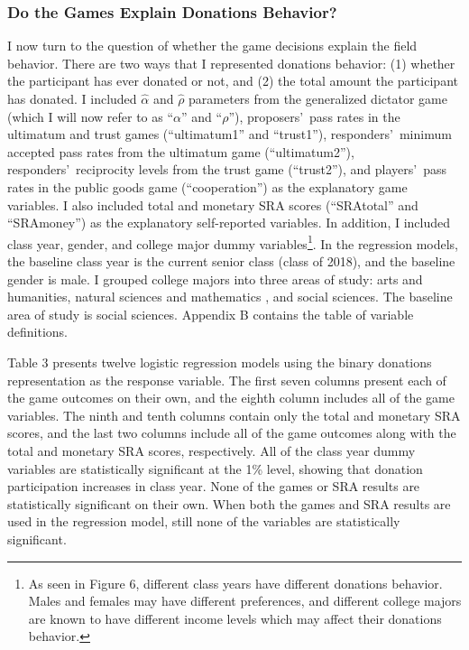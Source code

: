 \documentclass[12pt]{article}
\begin{document}
\subsubsection{Do the Games Explain Donations Behavior?}
I now turn to the question of whether the game decisions explain the field behavior. There are two ways that I represented donations behavior: (1) whether the participant has ever donated or not, and (2) the total amount the participant has donated. I included \(\hat{\alpha}\) and \(\hat{\rho}\) parameters from the generalized dictator game (which I will now refer to as ``\(\alpha\)'' and ``\(\rho\)''), proposers\rq \ pass rates in the ultimatum and trust games (``ultimatum1'' and ``trust1''), responders\rq \ minimum accepted pass rates from the ultimatum game (``ultimatum2''), responders\rq \ reciprocity levels from the trust game (``trust2''), and players\rq \ pass rates in the public goods game (``cooperation'') as the explanatory game variables. I also included total and monetary SRA scores (``SRAtotal'' and ``SRAmoney'') as the explanatory self-reported variables. In addition, I included class year, gender, and college major dummy variables\footnote{As seen in Figure 6, different class years have different donations behavior. Males and females may have different preferences, and different college majors are known to have different income levels which may affect their donations behavior.}. In the regression models, the baseline class year is the current senior class (class of 2018), and the baseline gender is male. I grouped college majors into three areas of study: arts and humanities, natural sciences and mathematics , and social sciences. The baseline area of study is social sciences. Appendix B contains the table of variable definitions. 

Table 3 presents twelve logistic regression models using the binary donations representation as the response variable. The first seven columns present each of the game outcomes on their own, and the eighth column includes all of the game variables. The ninth and tenth columns contain only the total and monetary SRA scores, and the last two columns include all of the game outcomes along with the total and monetary SRA scores, respectively. All of the class year dummy variables are statistically significant at the 1\% level, showing that donation participation increases in class year. None of the games or SRA results are statistically significant on their own. When both the games and SRA results are used in the regression model, still none of the variables are statistically significant. 
\end{document}
